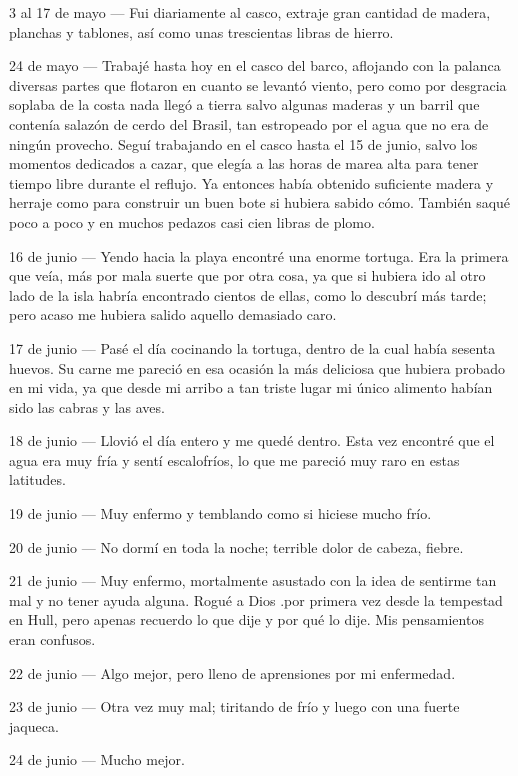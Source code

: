 \documentclass{novela}
\begin{document}
    3 al 17 de mayo — Fui diariamente al casco, extraje gran cantidad de madera, planchas y tablones, así como unas trescientas libras de hierro.


    24 de mayo — Trabajé hasta hoy en el casco del barco, aflojando con la palanca diversas partes que flotaron en cuanto se levantó viento, pero como por desgracia soplaba de la costa nada llegó a tierra salvo algunas maderas y un barril que contenía salazón de cerdo del Brasil, tan estropeado por el agua que no era de ningún provecho.
    Seguí trabajando en el casco hasta el 15 de junio, salvo los momentos dedicados a cazar, que elegía a las horas de marea alta para tener tiempo libre durante el reflujo. Ya entonces había obtenido suficiente madera y herraje como para construir un buen bote si hubiera sabido cómo. También saqué poco a poco y en muchos pedazos casi cien libras de plomo.


    16 de junio — Yendo hacia la playa encontré una enorme tortuga. Era la primera que veía, más por mala suerte que por otra cosa, ya que si hubiera ido al otro lado de la isla habría encontrado cientos de ellas, como lo descubrí más tarde; pero acaso me hubiera salido aquello demasiado caro.


    17 de junio — Pasé el día cocinando la tortuga, dentro de la cual había sesenta huevos. Su carne me pareció en esa ocasión la más deliciosa que hubiera probado en mi vida, ya que desde mi arribo a tan triste lugar mi único alimento habían sido las cabras y las aves.


    18  de junio — Llovió el día entero y me quedé dentro. Esta vez encontré que el agua era muy fría y sentí escalofríos, lo que me pareció muy raro en estas latitudes.


    19 de junio — Muy enfermo y temblando como si hiciese mucho frío.


    20 de junio — No dormí en toda la noche; terrible dolor de cabeza, fiebre.


    21  de junio — Muy enfermo, mortalmente asustado con la idea de sentirme tan mal y no tener ayuda alguna. Rogué a Dios .por primera vez desde la tempestad en Hull, pero apenas recuerdo lo que dije y por qué lo dije. Mis pensamientos eran confusos.


    22  de junio — Algo mejor, pero lleno de aprensiones por mi enfermedad.


    23  de junio — Otra vez muy mal; tiritando de frío y luego con una fuerte jaqueca.


    24 de junio — Mucho mejor.
\end{document}
